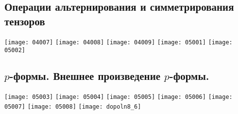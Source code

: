 \documentclass[../main.tex]{subfiles}
\begin{document}
		
	\subsection{Операции альтернирования и симметрирования тензоров}
	 	\texttt{[image: 04007]}	
		\n
		\texttt{[image: 04008]}	
		\n
		\texttt{[image: 04009]}
		\n
		\texttt{[image: 05001]}
		\n
		\texttt{[image: 05002]}
	\subsection{$p$-формы. Внешнее произведение $p$-формы.}
		\texttt{[image: 05003]}
		\n
		\texttt{[image: 05004]}
		\n
		\texttt{[image: 05005]}
		\n
		\texttt{[image: 05006]}
		\n
		\texttt{[image: 05007]}
		\n
		\texttt{[image: 05008]}
		\n
		\texttt{[image: dopoln8\_6]}	
\end{document}
